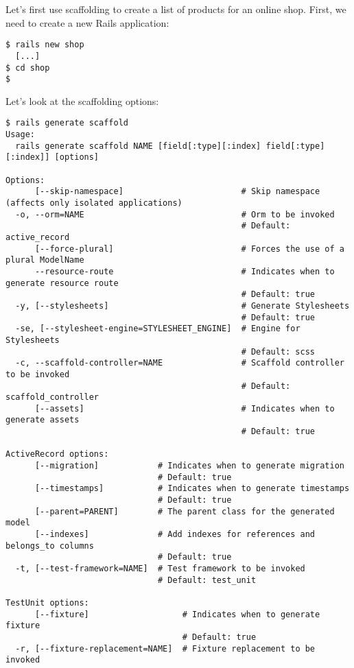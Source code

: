 \documentclass[a4paper]{book}
\begin{document}
Let's first use scaffolding to create a list of products for an online shop. First, we need to create a new Rails application:

\begin{shaded}\begin{verbatim}
$ rails new shop
  [...]
$ cd shop
$
\end{verbatim}\end{shaded}

Let's look at the scaffolding options:

\begin{shaded}\begin{verbatim}
$ rails generate scaffold
Usage:
  rails generate scaffold NAME [field[:type][:index] field[:type][:index]] [options]

Options:
      [--skip-namespace]                        # Skip namespace (affects only isolated applications)
  -o, --orm=NAME                                # Orm to be invoked
                                                # Default: active_record
      [--force-plural]                          # Forces the use of a plural ModelName
      --resource-route                          # Indicates when to generate resource route
                                                # Default: true
  -y, [--stylesheets]                           # Generate Stylesheets
                                                # Default: true
  -se, [--stylesheet-engine=STYLESHEET_ENGINE]  # Engine for Stylesheets
                                                # Default: scss
  -c, --scaffold-controller=NAME                # Scaffold controller to be invoked
                                                # Default: scaffold_controller
      [--assets]                                # Indicates when to generate assets
                                                # Default: true

ActiveRecord options:
      [--migration]            # Indicates when to generate migration
                               # Default: true
      [--timestamps]           # Indicates when to generate timestamps
                               # Default: true
      [--parent=PARENT]        # The parent class for the generated model
      [--indexes]              # Add indexes for references and belongs_to columns
                               # Default: true
  -t, [--test-framework=NAME]  # Test framework to be invoked
                               # Default: test_unit

TestUnit options:
      [--fixture]                   # Indicates when to generate fixture
                                    # Default: true
  -r, [--fixture-replacement=NAME]  # Fixture replacement to be invoked


\end{verbatim}
\end{shaded}
\end{document}
